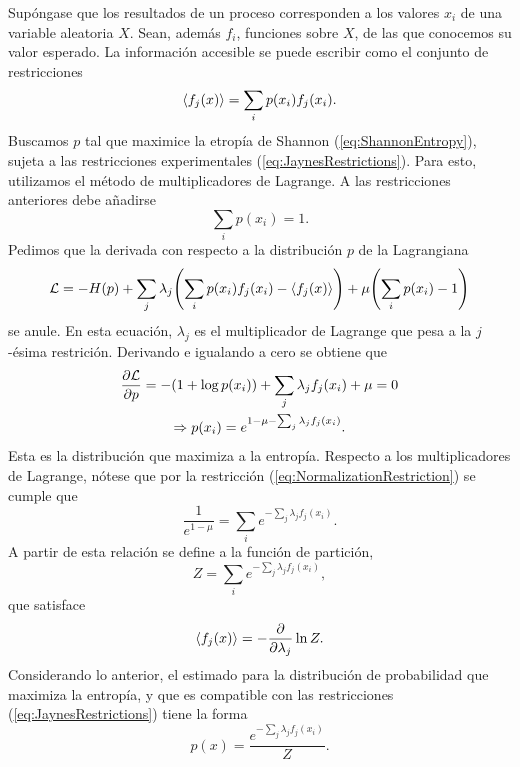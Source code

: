 Supóngase que los resultados de un proceso corresponden a los valores $x_{i}$ de una variable aleatoria $X$. Sean, además $f_{i}$, funciones sobre $X$, de las que conocemos su valor esperado. La información accesible se puede escribir como el conjunto de restricciones
\begin{equation}\label{eq:JaynesRestrictions}
    \expval{f_{j}(x)}=\sum_{i}p(x_{i})f_{j}(x_{i}).
\end{equation}
Buscamos $p$ tal que maximice la etropía de Shannon (\ref{eq:ShannonEntropy}), sujeta a las restricciones experimentales (\ref{eq:JaynesRestrictions}). Para esto, utilizamos el método de multiplicadores de Lagrange. A las restricciones anteriores debe añadirse 
\begin{equation}\label{eq:NormalizationRestriction}
    \sum_{i}p(x_{i})=1.
\end{equation}
Pedimos que la derivada con respecto a la distribución $p$ de la Lagrangiana
\begin{equation*}
    \mathcal{L}=-H(p)+\sum_{j}\lambda_{j}\qty(\sum_{i}p(x_{i})f_{j}(x_{i})-\expval{f_{j}(x)})+\mu\qty(\sum_{i}p(x_{i})-1)
\end{equation*}
se anule. En esta ecuación, $\lambda_{j}$ es el multiplicador de Lagrange que pesa a la $j$-ésima restrición. Derivando e igualando a cero se obtiene que
\begin{gather*}
    \frac{\partial \mathcal{L}}{\partial p}=-(1+\log{p(x_{i})})+\sum_{j}\lambda_{j}f_{j}(x_{i})+\mu=0\\
    \Rightarrow p(x_{i})=e^{1-\mu-\sum_{j}\lambda_{j}f_{j}(x_{i})}.
\end{gather*}
Esta es la distribución que maximiza a la entropía. Respecto a los multiplicadores de Lagrange, nótese que por la restricción (\ref{eq:NormalizationRestriction}) se cumple que
\begin{equation*}
    \frac{1}{e^{1-\mu}}=\sum_{i}e^{-\sum_{j}\lambda_{j}f_{j}(x_{i})}.
\end{equation*}
A partir de esta relación se define a la función de partición,
\begin{equation*}
    Z=\sum_{i}e^{-\sum_{j}\lambda_{j}f_{j}(x_{i})},
\end{equation*}
que satisface
\begin{equation*}
    \expval{f_{j}(x)}=-\frac{\partial}{\partial \lambda_{j}}\ln{Z}.
\end{equation*}
Considerando lo anterior, el estimado para la distribución de probabilidad que maximiza la entropía, y que es compatible con las restricciones (\ref{eq:JaynesRestrictions}) tiene la forma 
\begin{equation}\label{eq:MaxEntDist}
    p(x)=\frac{e^{-\sum_{j}\lambda_{j}f_{j}(x_{i})}}{Z}.
\end{equation}


